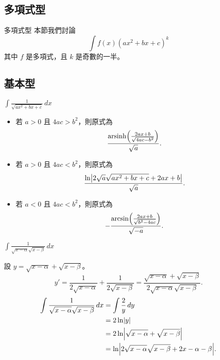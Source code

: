 \documentclass{beamer}
\newcommand{\Left} {\mathopen{}\mathclose\bgroup\left}
\newcommand{\Right}{\aftergroup\egroup\right}
\newcommand{\arsinh}{\operatorname{arsinh}}
\theoremstyle{remark}
\begin{document}
\begin{CJK}{UTF8}{bsmi}
\section{多項式型}
\begin{frame}{多項式型}
  本節我們討論
  \[\int f(x) \left( ax^2 + bx + c \right)^k\]
  其中 $f$ 是多項式，且 $k$ 是奇數的一半。
\end{frame}

\subsection{基本型}
\begin{frame}{$\displaystyle \int \frac{1}{\sqrt{ax^2 + bx + c}}\,dx$}
  \begin{itemize}
    \item 若 $a > 0$ 且 $4ac > b^2$，則原式為
      \[\frac{\arsinh \Left( \frac{2ax + b}{\sqrt{4ac - b^2}} \Right)}{\sqrt a}.\]
    \item 若 $a > 0$ 且 $4ac < b^2$，則原式為
      \[\frac{\ln \Left| 2 \sqrt a \sqrt{ax^2 + bx + c} + 2ax + b \Right|}{\sqrt a}.\]
    \item 若 $a < 0$ 且 $4ac < b^2$，則原式為
      \[-\frac{\arcsin \Left( \frac{2ax + b}{\sqrt{b^2 - 4ac}} \Right)}{\sqrt{-a}}.\]
  \end{itemize}
\end{frame}

\begin{frame}{$\displaystyle \int \frac{1}{\sqrt{x - \alpha} \sqrt{x - \beta}}\,dx$}
  \begin{solution}
    設 $y = \sqrt{x - \alpha} + \sqrt{x - \beta}$。
    \[y' = \frac{1}{2 \sqrt{x - \alpha}} + \frac{1}{2 \sqrt{x - \beta}}
      = \frac{\sqrt{x - \alpha} + \sqrt{x - \beta}}{2 \sqrt{x - \alpha} \sqrt{x - \beta}}.\]
    \begin{align*}
      \int \frac{1}{\sqrt{x - \alpha} \sqrt{x - \beta}}\,dx &= \int \frac{2}{y}\,dy\\
	&= 2 \ln \Left| y \Right|\\
	&= 2 \ln \Left| \sqrt{x - \alpha} + \sqrt{x - \beta} \Right|\\
	&= \ln \Left| 2 \sqrt{x - \alpha} \sqrt{x - \beta} + 2x - \alpha - \beta \Right|.
    \end{align*}
  \end{solution}
\end{frame}


\end{CJK}
\end{document}

